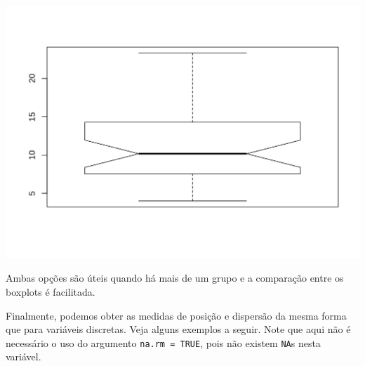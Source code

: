 \documentclass[10pt,a4paper]{book}
\newenvironment{Shaded}{\begin{snugshade}}{\end{snugshade}}
\newcommand{\KeywordTok}[1]{\textcolor[rgb]{0.13,0.29,0.53}{\textbf{#1}}}
\newcommand{\DataTypeTok}[1]{\textcolor[rgb]{0.13,0.29,0.53}{#1}}
\newcommand{\OtherTok}[1]{\textcolor[rgb]{0.56,0.35,0.01}{#1}}
\newcommand{\OperatorTok}[1]{\textcolor[rgb]{0.81,0.36,0.00}{\textbf{#1}}}
\newcommand{\NormalTok}[1]{#1}
\begin{document}
\begin{Shaded}
\end{Shaded}

\begin{center}\includegraphics{figures/unnamed-chunk-313-1} \end{center}

Ambas opções são úteis quando há mais de um grupo e a comparação entre
os boxplots é facilitada.

Finalmente, podemos obter as medidas de posição e dispersão da mesma
forma que para variáveis discretas. Veja alguns exemplos a seguir. Note
que aqui não é necessário o uso do argumento \texttt{na.rm\ =\ TRUE},
pois não existem \texttt{NA}s nesta variável.
\end{document}
